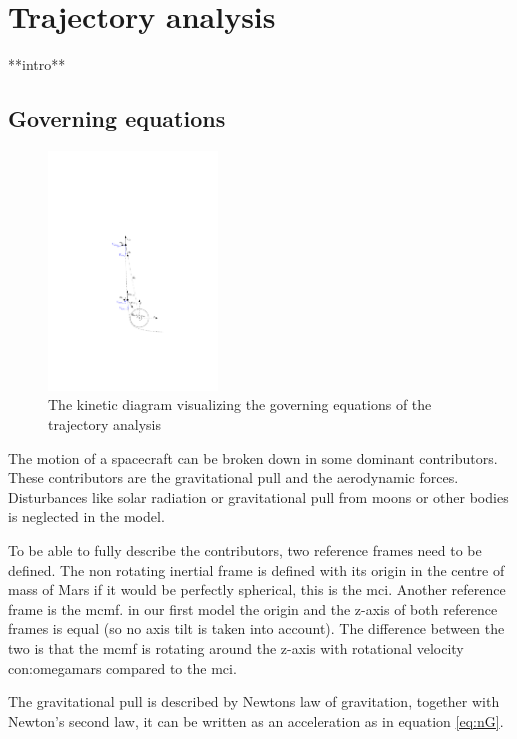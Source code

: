 \section{Trajectory analysis} \label{ch:trajectory}

**intro**

\subsection{Governing equations}\label{sec:gov}

\begin{figure}
		\centering
		\includegraphics[width = 0.4\textwidth]{Figure/orbital_mechanics.pdf}
		\caption{The kinetic diagram visualizing the governing equations of the trajectory analysis}
		\label{fig:orb}
\end{figure}

The motion of a spacecraft can be broken down in some dominant contributors. These contributors are the gravitational pull and the aerodynamic forces. Disturbances like solar radiation or gravitational pull from moons or other bodies is neglected in the model.

To be able to fully describe the contributors, two reference frames need to be defined. The non rotating inertial frame is defined with its origin in the centre of mass of Mars if it would be perfectly spherical, this is the \gls{mci}. 
Another reference frame is the \gls{mcmf}. in our first model the origin and the z-axis of both reference frames is equal (so no axis tilt is taken into account). The difference between the two is that the \gls{mcmf} is rotating around the z-axis with rotational velocity \gls{con:omegamars} compared to the \gls{mci}.

The gravitational pull is described by Newtons law of gravitation, together with Newton's second law, it can be written as an acceleration as in equation \ref{eq:nG}.

